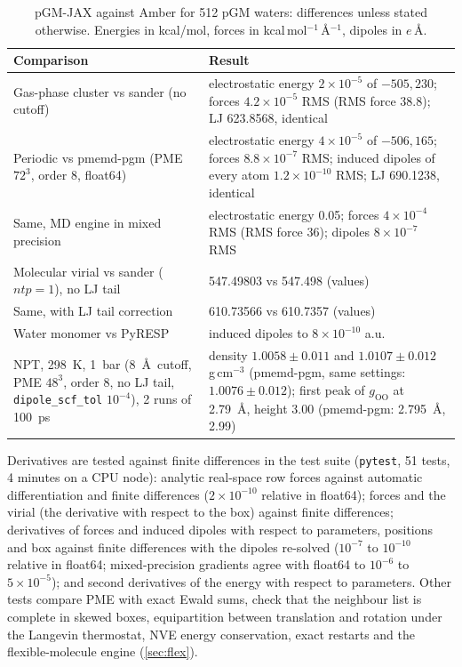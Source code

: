 \documentclass[11pt]{article}
\newcommand{\code}[1]{\texttt{#1}}
\begin{document}
\begin{table}[t]
\centering\small
\caption{pGM-JAX against Amber for 512 pGM waters: differences unless stated otherwise.
Energies in kcal/mol, forces in kcal\,mol$^{-1}$\,\AA$^{-1}$, dipoles in $e$\,\AA.}
\label{tab:validation}
\begin{tabular}{@{}p{6.2cm}p{8.6cm}@{}}
\toprule
Comparison & Result \\
\midrule
Gas-phase cluster vs sander (no cutoff) & electrostatic energy $2\times10^{-5}$ of $-505{,}230$;
forces $4.2\times10^{-5}$ RMS (RMS force 38.8); LJ 623.8568, identical \\
Periodic vs pmemd-pgm (PME $72^3$, order 8, float64) & electrostatic energy $4\times10^{-5}$ of
$-506{,}165$; forces $8.8\times10^{-7}$ RMS; induced dipoles of every atom $1.2\times10^{-10}$ RMS;
LJ 690.1238, identical \\
Same, MD engine in mixed precision & electrostatic energy 0.05; forces $4\times10^{-4}$ RMS
(RMS force 36); dipoles $8\times10^{-7}$ RMS \\
Molecular virial vs sander ($ntp=1$), no LJ tail & 547.49803 vs 547.498 (values) \\
Same, with LJ tail correction & 610.73566 vs 610.7357 (values) \\
Water monomer vs PyRESP & induced dipoles to $8\times10^{-10}$ a.u. \\
NPT, 298~K, 1~bar (8~\AA\ cutoff, PME $48^3$, order 8, no LJ tail, \code{dipole\_scf\_tol}
$10^{-4}$), 2 runs of 100~ps & density $1.0058\pm0.011$ and $1.0107\pm0.012$ g\,cm$^{-3}$
(pmemd-pgm, same settings: $1.0076\pm0.012$); first peak of $g_\mathrm{OO}$ at 2.79~\AA, height
3.00 (pmemd-pgm: 2.795~\AA, 2.99) \\
\bottomrule
\end{tabular}
\end{table}

Derivatives are tested against finite differences in the test suite (\code{pytest}, 51 tests,
4 minutes on a CPU node): analytic real-space row forces against automatic differentiation
and finite differences ($2\times10^{-10}$ relative in float64); forces and the virial (the
derivative with respect to the box) against finite differences; derivatives of forces and
induced dipoles with respect to parameters, positions and box against finite differences with
the dipoles re-solved ($10^{-7}$ to $10^{-10}$ relative in float64; mixed-precision gradients
agree with float64 to $10^{-6}$ to $5\times10^{-5}$); and second derivatives of the energy with
respect to parameters. Other tests compare PME with exact Ewald sums, check that the neighbour
list is complete in skewed boxes, equipartition between translation and rotation under the
Langevin thermostat, NVE energy conservation, exact restarts and the flexible-molecule engine
(\cref{sec:flex}).
\end{document}
